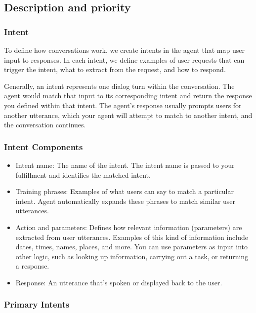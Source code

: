\documentclass{scrreprt}
\begin{document}
\subsection{Description and priority}

\subsubsection{Intent}

To define how conversations work, we create intents in the agent that map user input to responses. In each intent, we define examples of user requests that can trigger the intent, what to extract from the request, and how to respond.

Generally, an intent represents one dialog turn within the conversation. The agent would match that input to its corresponding intent and return the response you defined within that intent. The agent's response usually prompts users for another utterance, which your agent will attempt to match to another intent, and the conversation continues.



\subsubsection{Intent Components}

\begin{itemize}
    \item Intent name: The name of the intent. The intent name is passed to your fulfillment and identifies the matched intent.

    \item Training phrases: Examples of what users can say to match a particular intent. Agent automatically expands these phrases to match similar user utterances.

    \item Action and parameters: Defines how relevant information (parameters) are extracted from user utterances. Examples of this kind of information include dates, times, names, places, and more. You can use parameters as input into other logic, such as looking up information, carrying out a task, or returning a response.

    \item Response: An utterance that's spoken or displayed back to the user.
\end{itemize}


\subsubsection{Primary Intents}
\end{document}

